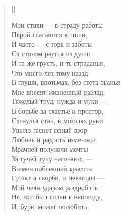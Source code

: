 \settowidth{\versewidth}{И та же грусть, и те страданья,}
\begin{verse}[\versewidth]
\begin{altverse}
Мои стихи --- в страду работы\\
    Порой слагаются в тиши,\\
И часто --- с горя и заботы\\
    Со стоном рвутся из души\ldotst\\
И та же грусть, и те страданья,\\
    Что много лет тому назад\\
В глуши, впотьмах, без света-знанья\\
	Мне вносят жизненный разлад.\\
Тяжелый труд, нужда и муки ---\\
    В борьбе за счастье и простор,\\
Согнулся стан, в мозолях руки,\\
    Уныло гаснет ясный взор\ldotst\\
Любовь и радость изменяют\ldotst\\
    Мрачней полуночи мечты\ldotst\\
За тучей тучу нагоняют, ---\\
    Взамен поблекшей красоты\ldotst\\
Грозят и скорби, и невзгоды ---\\
    Мой челн ударом раздробить\ldotse\\
Но, кто был силен в непогоду,\\
    И, бурю может полюбить\ldotst
\end{altverse}
\end{verse}

\newpage
\vspace*{0cm}


\newpage
\vspace*{0cm}



\newpage
\vspace*{0cm}


